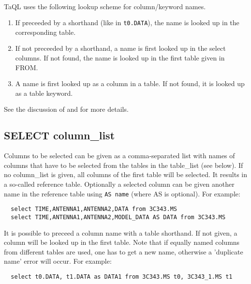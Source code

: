 \paragraph*{}
TaQL uses the following lookup scheme for column/keyword names.
\begin{enumerate}
\item If preceeded by a shorthand (like in \texttt{t0.DATA}), the name
  is looked up in the corresponding table.
\item If not preceeded by a shorthand, a name is first looked up in
  the select columns. If not found, the name is looked up in the first
  table given in FROM.
\item A name is first looked up as a column in a table. If not found,
  it is looked up as a table keyword.
\end{enumerate}
See the discussion of 
and  for more details.


\subsection{\label{TAQL:COLUMNLIST}SELECT column\_list}
Columns to be selected can be given as
a comma-separated list with names of columns that have to be
selected from the tables in the table\_list (see below).
If no column\_list is given, all columns of the first table will be selected.
It results in a so-called reference table. Optionally a
selected column can be given another name in the reference
table using \texttt{AS name} (where AS is optional).
For example:
\begin{verbatim}
  select TIME,ANTENNA1,ANTENNA2,DATA from 3C343.MS
  select TIME,ANTENNA1,ANTENNA2,MODEL_DATA AS DATA from 3C343.MS
\end{verbatim}
It is possible to preceed a column name with a table shorthand. If not
given, a column will be looked up in the first table. Note that if
equally named columns from different tables are used, one has to get a
new name, otherwise a 'duplicate name' error will occur.
For example:
\begin{verbatim}
  select t0.DATA, t1.DATA as DATA1 from 3C343.MS t0, 3C343_1.MS t1
\end{verbatim}

